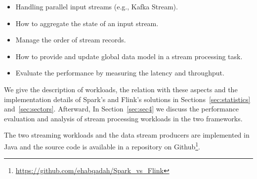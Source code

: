 \documentclass[]{article}
\begin{document}
\begin{itemize}
\item Handling parallel input streams (e.g., Kafka Stream).
\item How to aggregate the state of an input stream.
\item Manage the order of stream records.
\item How to provide and update global data model in a stream processing task.
\item Evaluate the performance by measuring the latency and throughput.
\end{itemize}
We give the description of workloads, the relation with these aspects and  the implementation details of Spark's and Flink's solutions in Sections~\ref{sec:statistics} and~\ref{sec:sectors}. Afterward, In Section~\ref{sec:sec4} we discuss the performance evaluation and analysis of stream processing workloads in the two frameworks. 
\par The two streaming workloads and the data stream producers are implemented in Java and the source code is available in a repository on Github\footnote{\url{https://github.com/ehabqadah/Spark_vs_Flink}}. 
\end{document}
